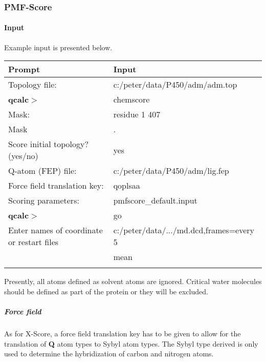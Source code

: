 \documentclass[a4paper,10pt]{article}
\begin{document}
 \subsubsection{PMF-Score}
 \paragraph{Input}
   Example input is presented below.

   \begin{minipage}[t]{0.2\textwidth}
    \centering
    \begin{tabular}{ll}
      Prompt                        & Input     \\
      \hline
      Topology file:                & c:/peter/data/P450/adm/adm.top  \\
      \textbf{qcalc}$>$                        & chemscore    \\
      Mask:                         & residue 1 407       \\
      Mask                          & .         \\

      Score initial topology? (yes/no) & yes                                  \\
      Q-atom (FEP) file:               & c:/peter/data/P450/adm/lig.fep  \\
      Force field translation key:  & qoplsaa \\
      Scoring parameters:           & pmfscore\_default.input \\
      \textbf{qcalc}$>$                         & go                                   \\
      Enter names of coordinate or restart files & c:/peter/data/.../md.dcd,frames=every 5 \\
                                   &  mean                                \\
      \hline
        & \\
    \end{tabular}
    \label{xinput}
  \end{minipage}

  Presently, all atoms defined as solvent atoms are ignored. Critical water molecules should be defined as part of the protein or they will be excluded.

  \subparagraph{Force field}
  As for X-Score, a force field translation key has to be given to allow for the translation of \textbf{Q} atom types to Sybyl atom types. The Sybyl type derived is only used to determine the hybridization of carbon and nitrogen atoms.
\end{document}
